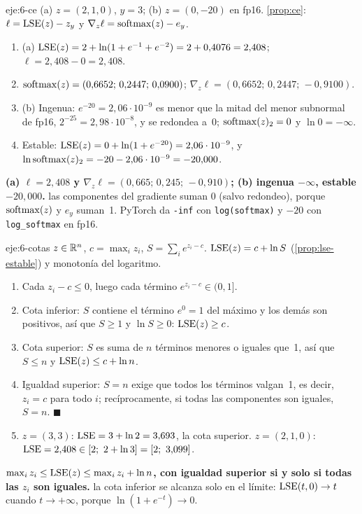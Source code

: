 \begin{solucion}{eje:6-ce}
\datos (a) $z=(2,1,0)$, $y=3$; (b) $z=(0,-20)$ en fp16.
\planteamiento \cref{prop:ce}: $\ell=\operatorname{LSE}(z)-z_y$ y $\nabla_z\ell=\operatorname{softmax}(z)-e_y$.
\pasos
\begin{enumerate}[label=\arabic*.]
  \item (a) $\operatorname{LSE}(z)=2+\ln(1+e^{-1}+e^{-2})=2+0{,}4076=2{,}408$; $\ell=2{,}408-0=2{,}408$.
  \item $\operatorname{softmax}(z)=(0{,}6652;\,0{,}2447;\,0{,}0900)$; $\nabla_z\ell=(0{,}6652;\,0{,}2447;\,-0{,}9100)$.
  \item (b) Ingenua: $e^{-20}=2{,}06\cdot 10^{-9}$ es menor que la mitad del menor subnormal de fp16, $2^{-25}=2{,}98\cdot 10^{-8}$, y se redondea a~0; $\operatorname{softmax}(z)_2=0$ y $\ln 0=-\infty$.
  \item Estable: $\operatorname{LSE}(z)=0+\ln(1+e^{-20})=2{,}06\cdot 10^{-9}$, y $\ln\operatorname{softmax}(z)_2=-20-2{,}06\cdot 10^{-9}=-20{,}000$.
\end{enumerate}
\resultado \textbf{(a) $\ell=2{,}408$ y $\nabla_z\ell=(0{,}665;\,0{,}245;\,-0{,}910)$; (b) ingenua $-\infty$, estable $-20{,}000$.}
\comprobacion las componentes del gradiente suman $0$ (salvo redondeo), porque $\operatorname{softmax}(z)$ y $e_y$ suman~1. PyTorch da \texttt{-inf} con \texttt{log(softmax)} y $-20$ con \texttt{log\_softmax} en fp16.
\end{solucion}

\begin{solucion}{eje:6-cotas}
\datos $z\in\mathbb{R}^{n}$, $c=\max_iz_i$, $S=\sum_ie^{z_i-c}$.
\planteamiento $\operatorname{LSE}(z)=c+\ln S$ (\cref{prop:lse-estable}) y monotonía del logaritmo.
\pasos
\begin{enumerate}[label=\arabic*.]
  \item Cada $z_i-c\le 0$, luego cada término $e^{z_i-c}\in(0,1]$.
  \item Cota inferior: $S$ contiene el término $e^{0}=1$ del máximo y los demás son positivos, así que $S\ge 1$ y $\ln S\ge 0$: $\operatorname{LSE}(z)\ge c$.
  \item Cota superior: $S$ es suma de $n$ términos menores o iguales que~1, así que $S\le n$ y $\operatorname{LSE}(z)\le c+\ln n$.
  \item Igualdad superior: $S=n$ exige que todos los términos valgan~1, es decir, $z_i=c$ para todo $i$; recíprocamente, si todas las componentes son iguales, $S=n$. $\blacksquare$
  \item $z=(3,3)$: $\operatorname{LSE}=3+\ln 2=3{,}693$, la cota superior. $z=(2,1,0)$: $\LSE=2{,}408\in[2;\ 2+\ln 3]=[2;\ 3{,}099]$.
\end{enumerate}
\resultado \textbf{$\max_iz_i\le\operatorname{LSE}(z)\le\max_iz_i+\ln n$, con igualdad superior si y solo si todas las $z_i$ son iguales.}
\comprobacion la cota inferior se alcanza solo en el límite: $\operatorname{LSE}(t,0)\to t$ cuando $t\to+\infty$, porque $\ln(1+e^{-t})\to 0$.
\end{solucion}

